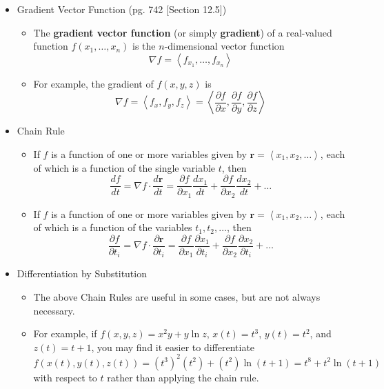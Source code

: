 \documentclass[12pt]{article}
\theoremstyle{plain}
\theoremstyle{definition}
\theoremstyle{remark}
\newcommand{\vect}[1]{\mathbf{#1}}
\begin{document}
	\begin{itemize}
	
	\item Gradient Vector Function (pg. 742 [Section 12.5])
	
		\begin{itemize}
		\item The \textbf{gradient vector function} (or simply \textbf{gradient}) of a real-valued function $f(x_1,\dots,x_n)$ is the $n$-dimensional vector function \[\nabla f = \left\langle f_{x_1}, \dots, f_{x_n} \right\rangle\]
		\item For example, the gradient of $f(x,y,z)$ is \[\nabla f = \left\langle f_x,f_y,f_z \right\rangle = \left\langle \frac{\partial f}{\partial x}, \frac{\partial f}{\partial y}, \frac{\partial f}{\partial z} \right\rangle\]
		\end{itemize}
	
	\item Chain Rule
	
		\begin{itemize}
		\item If $f$ is a function of one or more variables given by $\vect{r}=\left<x_1,x_2,\dots\right>$, each of which is a function of the single variable $t$, then \[\frac{df}{dt}=\nabla{f}\cdot\frac{d\vect{r}}{dt}=\frac{\partial f}{\partial x_1}\frac{dx_1}{dt}+\frac{\partial f}{\partial x_2}\frac{dx_2}{dt}+\dots\]
		\item If $f$ is a function of one or more variables given by $\vect{r}=\left<x_1,x_2,\dots\right>$, each of which is a function of the variables $t_1,t_2,\dots$, then \[\frac{\partial f}{\partial t_i}=\nabla{f}\cdot\frac{\partial\vect{r}}{\partial t_i}=\frac{\partial f}{\partial x_1}\frac{\partial x_1}{\partial t_i}+\frac{\partial f}{\partial x_2}\frac{\partial x_2}{\partial t_i}+\dots\]
		\end{itemize}
		
	\item Differentiation by Substitution
	
		\begin{itemize}
		\item The above Chain Rules are useful in some cases, but are not always necessary.
		\item For example, if $f(x,y,z) = x^2y+y\ln z$, $x(t) = t^3$, $y(t) = t^2$, and $z(t) = t+1$, you may find it easier to differentiate \[f(x(t),y(t),z(t)) = (t^3)^2(t^2)+(t^2)\ln(t+1) = t^8 + t^2\ln(t+1)\] with respect to $t$ rather than applying the chain rule.
		\end{itemize}
		

\end{itemize}
\end{document}
